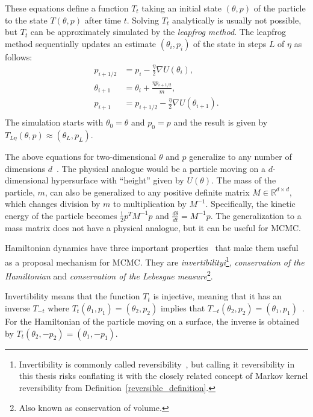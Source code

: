 \documentclass[english,twoside,openright]{HYgraduMLDS}
\newcommand{\R}{\mathbb{R}}
\begin{document}
These equations define a function \(T_t\) taking an initial state 
\((\theta, p)\) of the particle to the state \(T(\theta, p)\) after time \(t\).
Solving \(T_t\) analytically is usually not possible, but \(T_t\) can be 
approximately simulated by the \emph{leapfrog method}. The leapfrog method sequentially
updates an estimate \((\theta_i, p_i)\) of the state in steps \(L\) of \(\eta\) 
as follows:
\begin{align*}
    p_{i+1/2} &= p_i - \frac{\eta}{2}\nabla U(\theta_i), \\
    \theta_{i+1} &= \theta_i + \frac{\eta p_{i+1/2}}{m}, \\
    p_{i+1} &= p_{i+1/2} - \frac{\eta}{2}\nabla U(\theta_{i+1}). \\
\end{align*}
The simulation starts with \(\theta_0 = \theta\) and \(p_0 = p\) and the 
result is given by \(T_{L\eta}(\theta, p) \approx (\theta_L, p_L)\).

The above equations for two-dimensional \(\theta\) and \(p\) generalize to
any number of dimensions \(d\)~\cite{neal2012mcmc}. The physical analogue would be a particle moving
on a \(d\)-dimensional hypersurface with ``height'' given by \(U(\theta)\).
The mass of the particle, \(m\), can also be generalized to any positive
definite matrix \(M \in \R^{d\times d}\), which changes division by
\(m\) to multiplication by \(M^{-1}\). Specifically, the kinetic energy of the
particle becomes \(\frac{1}{2}p^{T}M^{-1}p\) and
\(\frac{d\theta}{dt} = M^{-1}p\). The generalization to a mass matrix does not
have a physical analogue, but it can be useful for MCMC.

Hamiltonian dynamics have three important properties~\cite{neal2012mcmc} 
that make them useful as a
proposal mechanism for MCMC. They are \emph{invertibilityi}\footnote{
  Invertibility is commonly called reversibility~\cite{neal2012mcmc}, but
  calling it reversibility in this thesis risks conflating it with
  the closely related concept of Markov kernel reversibility from
  Definition~\ref{reversible_definition}.
},
\emph{conservation of the Hamiltonian} and
\emph{conservation of the Lebesgue measure}\footnote{Also
  known as conservation of volume.
}.

Invertibility means that the function \(T_t\) is injective, meaning that
it has an inverse \(T_{-t}\) where \(T_t(\theta_1, p_1) = (\theta_2, p_2)\)
implies that \(T_{-t}(\theta_2, p_2) = (\theta_1, p_1)\)~\cite{neal2012mcmc}.
For the Hamiltonian of the particle moving on a surface, the inverse 
is obtained by \(T_t(\theta_2, -p_2) = (\theta_1, -p_1)\).
\end{document}
